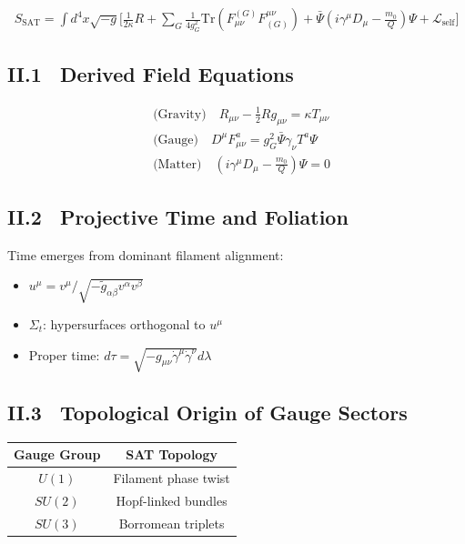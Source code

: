 \begin{align}
S_{\text{SAT}} = \int d^4x \sqrt{-g} \Big[ \frac{1}{2\kappa} R
+ \sum_G \frac{1}{4g_G^2} \text{Tr}(F^{(G)}_{\mu\nu} F^{\mu\nu}_{(G)}) 
+ \bar{\Psi}(i\gamma^\mu D_\mu - \tfrac{m_0}{Q})\Psi 
+ \mathcal{L}_{\text{self}} \Big]
\end{align}

\subsection{II.1~ Derived Field Equations}
\begin{align}
& \text{(Gravity)}\quad R_{\mu\nu} - \tfrac{1}{2} R g_{\mu\nu} = \kappa T_{\mu\nu} \\
& \text{(Gauge)}\quad D^\mu F^a_{\mu\nu} = g_G^2 \bar\Psi \gamma_\nu T^a \Psi \\
& \text{(Matter)}\quad (i\gamma^\mu D_\mu - \tfrac{m_0}{Q}) \Psi = 0
\end{align}

\subsection{II.2~ Projective Time and Foliation}

Time emerges from dominant filament alignment:
\begin{itemize}
  \item $u^\mu = v^\mu / \sqrt{-\tilde g_{\alpha\beta}v^\alpha v^\beta}$
  \item $\Sigma_t$: hypersurfaces orthogonal to $u^\mu$
  \item Proper time: $d\tau = \sqrt{-g_{\mu\nu} \dot\gamma^\mu \dot\gamma^\nu} d\lambda$
\end{itemize}

\subsection{II.3~ Topological Origin of Gauge Sectors}

\begin{center}
\begin{tabular}{|c|c|}
\hline
Gauge Group & SAT Topology \\\hline
$U(1)$ & Filament phase twist \\
$SU(2)$ & Hopf-linked bundles \\
$SU(3)$ & Borromean triplets \\\hline
\end{tabular}
\end{center}

